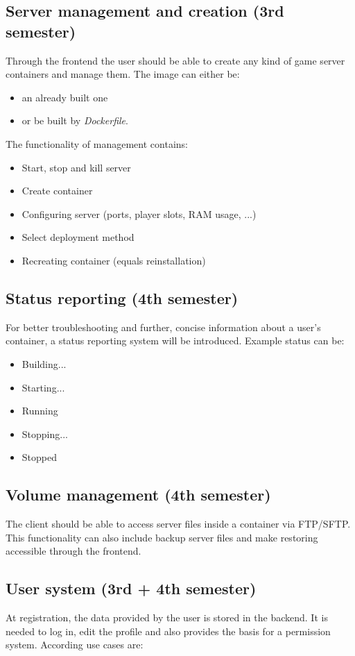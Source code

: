 \documentclass[a4paper,12pt,chapterprefix=false,bibliography=totoc,listof=totoc,]{scrreprt}
\begin{document}
\subsection{Server management and creation (3rd semester)}
Through the frontend the user should be able to create any kind of game server containers and manage them. The image can either be:
\begin{itemize}
	\item an already built one 
	\item or be built by \emph{Dockerfile}.
\end{itemize}
 
 
The functionality of management contains:
\begin{itemize}
	\item Start, stop and kill server
	\item Create container
	\item Configuring server (ports, player slots, RAM usage, ...)
	\item Select deployment method
	\item Recreating container (equals reinstallation)
\end{itemize}

\subsection{Status reporting (4th semester)}
For better troubleshooting and further, concise information about a user's container, a status reporting system will be introduced. Example status can be:
\begin{itemize}
	\item Building...
	\item Starting...
	\item Running
	\item Stopping...
	\item Stopped
\end{itemize}

\subsection{Volume management (4th semester)}
The client should be able to access server files inside a container via FTP/SFTP. This functionality can also include backup server files and make restoring accessible through the frontend.

\subsection{User system (3rd + 4th semester)}
At registration, the data provided by the user is stored in the backend. It is needed to log in, edit the profile and also provides the basis for a permission system. According use cases are:
\end{document}
